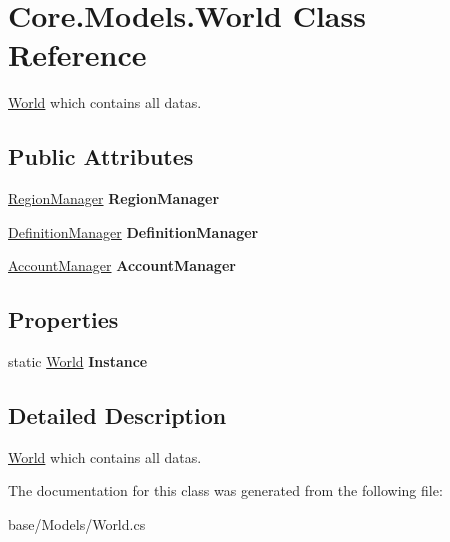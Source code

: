 \hypertarget{classCore_1_1Models_1_1World}{\section{Core.\-Models.\-World Class Reference}
\label{classCore_1_1Models_1_1World}
}


\hyperlink{classCore_1_1Models_1_1World}{World} which contains all datas.  


\subsection*{Public Attributes}
\begin{DoxyCompactItemize}
\item 
\hypertarget{classCore_1_1Models_1_1World_a768e4edfe667a4f55d93a7c5dfd297ba}{\hyperlink{classCore_1_1Models_1_1RegionManager}{Region\-Manager} {\bfseries Region\-Manager}}\label{classCore_1_1Models_1_1World_a768e4edfe667a4f55d93a7c5dfd297ba}

\item 
\hypertarget{classCore_1_1Models_1_1World_abcc61c9fa6e9d269a6e6ff1c04ddb1ca}{\hyperlink{classCore_1_1Models_1_1DefinitionManager}{Definition\-Manager} {\bfseries Definition\-Manager}}\label{classCore_1_1Models_1_1World_abcc61c9fa6e9d269a6e6ff1c04ddb1ca}

\item 
\hypertarget{classCore_1_1Models_1_1World_a9d17871a1c75acf406833c0d0e1eb4ef}{\hyperlink{classCore_1_1Models_1_1AccountManager}{Account\-Manager} {\bfseries Account\-Manager}}\label{classCore_1_1Models_1_1World_a9d17871a1c75acf406833c0d0e1eb4ef}

\end{DoxyCompactItemize}
\subsection*{Properties}
\begin{DoxyCompactItemize}
\item 
\hypertarget{classCore_1_1Models_1_1World_a1eb55db6738031929ddbca1b9aea971e}{static \hyperlink{classCore_1_1Models_1_1World}{World} {\bfseries Instance}}\label{classCore_1_1Models_1_1World_a1eb55db6738031929ddbca1b9aea971e}

\end{DoxyCompactItemize}


\subsection{Detailed Description}
\hyperlink{classCore_1_1Models_1_1World}{World} which contains all datas. 



The documentation for this class was generated from the following file\-:\begin{DoxyCompactItemize}
\item 
base/\-Models/World.\-cs\end{DoxyCompactItemize}
